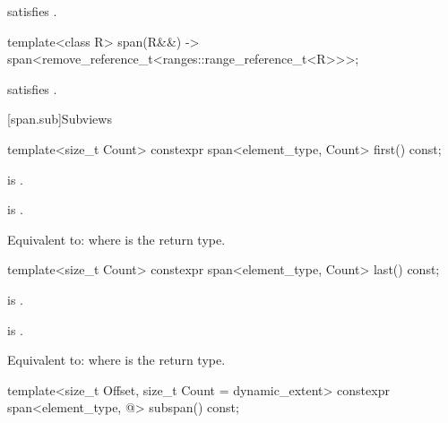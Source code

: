 \begin{itemdescr}
\pnum
\constraints
{} satisfies .
\end{itemdescr}

%
\begin{itemdecl}
template<class R>
  span(R&&) -> span<remove_reference_t<ranges::range_reference_t<R>>>;
\end{itemdecl}

\begin{itemdescr}
\pnum
\constraints
{} satisfies .
\end{itemdescr}

[span.sub]{Subviews}

%
\begin{itemdecl}
template<size_t Count> constexpr span<element_type, Count> first() const;
\end{itemdecl}

\begin{itemdescr}
\pnum
\mandates
{} is .

\pnum
\expects
{} is .

\pnum
\effects
Equivalent to: 
where  is the return type.
\end{itemdescr}

%
\begin{itemdecl}
template<size_t Count> constexpr span<element_type, Count> last() const;
\end{itemdecl}

\begin{itemdescr}
\pnum
\mandates
{} is .

\pnum
\expects
{} is .

\pnum
\effects
Equivalent to: 
where  is the return type.
\end{itemdescr}

%
\begin{itemdecl}
template<size_t Offset, size_t Count = dynamic_extent>
  constexpr span<element_type, @\seebelow@> subspan() const;
\end{itemdecl}

